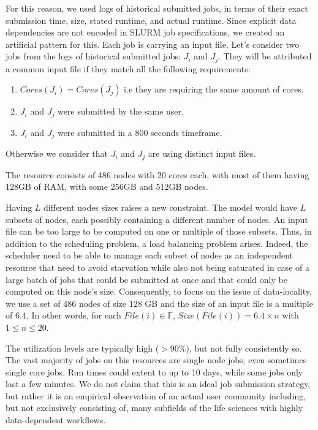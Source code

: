 \documentclass[conference,10pt]{IEEEtran}
\newcommand{\file}{\ensuremath{\mathit{File}}\xspace}
\newcommand{\size}{\ensuremath{\mathit{Size}}\xspace}
\newcommand{\core}{\mathit{Cores}\xspace}
\newcommand{\fileset}{\ensuremath{\mathbb{F}}\xspace}
\begin{document}
For this reason, we used logs of historical submitted jobs, in terms of their exact submission time, size, stated runtime, and actual runtime.
Since explicit data dependencies are not encoded in SLURM job specifications, we created an artificial pattern for this. 
Each job is carrying an input file.
Let's consider two jobs from the logs of historical submitted jobs: $J_i$ and $J_j$.
They will be attributed a common input file if they match all the following requirements:
\begin{enumerate}
	\item $\core(J_i) = \core(J_j)$ i.e they are requiring the same amount of cores.
	\item $J_i$ and $J_j$ were submitted by the same user.
	\item $J_i$ and $J_j$ were submitted in a 800 seconds timeframe.
\end{enumerate}
Otherwise we consider that $J_i$ and $J_j$ are using distinct input files.

The resource consists of 486 nodes with 20 cores each, with most of them having 128GB of RAM, with some 256GB and 512GB nodes. 

Having $L$ different nodes sizes raises a new constraint. The model would have
$L$ subsets of nodes, each possibly containing a different number of nodes.
An input file can be too large to be computed on one or multiple of those subsets.
Thus, in addition to the scheduling problem, a load balancing problem arises.
Indeed, the scheduler need to be able to manage each subset of nodes as an independent 
resource that need to avoid starvation while also not being saturated in case of a large
batch of jobs that could be submitted at once and that could only be computed on this node's size.
Consequently, to focus on the issue of data-locality, we use a set of 486 nodes of size 
128 GB and the size of an input file is a multiple of 6.4.
In other words, for each $\file(i) \in \fileset$, $\size(\file(i)) = 6.4 \times n$ with 
$1 \leq n \leq 20$.

The utilization levels are typically high ($>90\%$), but
not fully consistently so. The vast majority of jobs on this resources are single node jobs, even sometimes single core jobs. Run times
could extent to up to 10 days, while some jobs only last a few minutes. We do not claim that this is an ideal job submission strategy,
but rather it is an empirical observation of an actual user community including, but not exclusively consisting of, many subfields of the life sciences with highly data-dependent workflows.
\end{document}
